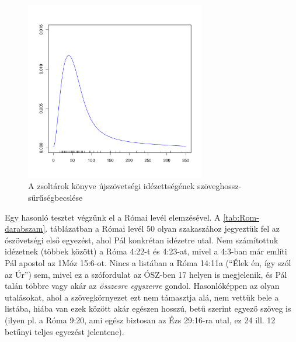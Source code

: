 \documentclass{article}
\begin{document}
\begin{figure}
\begin{center}
\includegraphics[width=0.7\textwidth]{../common/manual_nt_length_density.pdf}
\caption{A zsoltárok könyve újszövetségi idézettségének szöveghossz-sűrűségbecslése}
\label{kezi-hosszak-suruseg}
\end{center}
\end{figure}

Egy hasonló tesztet végzünk el a Római levél elemzésével. A \ref{tab:Rom-darabszam}. táblázatban
a Római levél 50 olyan szakaszához jegyeztük fel az ószövetségi első egyezést, ahol Pál
konkrétan idézetre utal. Nem számítottuk idézetnek (többek között) a Róma 4:22-t és 4:23-at,
mivel a 4:3-ban már említi Pál apostol az 1Móz 15:6-ot. Nincs a listában a Róma 14:11a
(``Élek én, így szól az Úr'') sem, mivel ez a szófordulat az ÓSZ-ben 17 helyen is megjelenik,
és Pál talán többre vagy akár az \textit{összesre egyszerre} gondol. Hasonlóképpen az olyan utalásokat,
ahol a szövegkörnyezet ezt nem támasztja alá, nem vettük bele a listába, hiába van ezek
között akár egészen hosszú, betű szerint egyező szöveg is (ilyen pl. a Róma 9:20,
ami egész biztosan az Ézs 29:16-ra utal, ez 24 ill. 12 betűnyi teljes egyezést jelentene).
\end{document}
